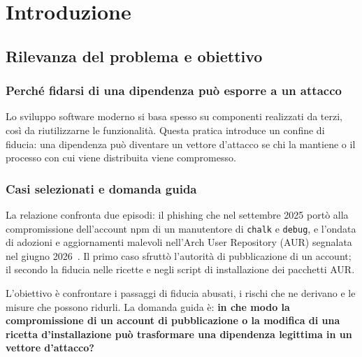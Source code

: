 \section{Introduzione}
\label{sec:introduzione}

\subsection{Rilevanza del problema e obiettivo}
\subsubsection{Perché fidarsi di una dipendenza può esporre a un attacco}

Lo sviluppo software moderno si basa spesso su componenti realizzati da terzi,
così da riutilizzarne le funzionalità. Questa pratica introduce un confine di
fiducia: una dipendenza può diventare un vettore d'attacco se chi la mantiene o
il processo con cui viene distribuita viene compromesso.

\subsubsection{Casi selezionati e domanda guida}

La relazione confronta due episodi: il phishing che nel settembre 2025 portò
alla compromissione dell'account npm di un manutentore di \texttt{chalk} e
\texttt{debug}, e l'ondata di adozioni e aggiornamenti malevoli nell'Arch User
Repository (AUR) segnalata nel giugno 2026~\cite{aikido2025,arch-aur-incident-2026}.
Il primo caso sfruttò l'autorità di pubblicazione di un account; il secondo la
fiducia nelle ricette e negli script di installazione dei pacchetti AUR.

L'obiettivo è confrontare i passaggi di fiducia abusati, i rischi che ne
derivano e le misure che possono ridurli. La domanda guida è: \textbf{in che
modo la compromissione di un account di pubblicazione o la modifica di una
ricetta d'installazione può trasformare una dipendenza legittima in un vettore
d'attacco?}
